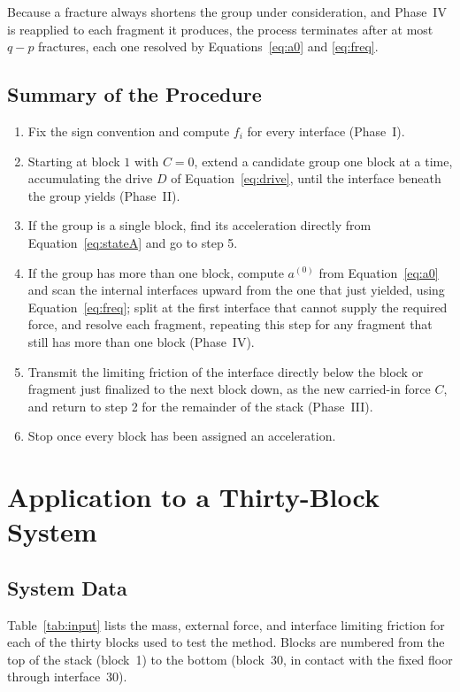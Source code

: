 \documentclass[11pt,a4paper]{article}
\begin{document}
Because a fracture always shortens the group under consideration, and Phase~IV is reapplied to each fragment it produces, the process terminates after at most $q-p$ fractures, each one resolved by Equations~\eqref{eq:a0} and \eqref{eq:freq}.

\subsection{Summary of the Procedure}

\begin{enumerate}[leftmargin=1.6em]
\item Fix the sign convention and compute $f_i$ for every interface (Phase~I).
\item Starting at block $1$ with $C=0$, extend a candidate group one block at a time, accumulating the drive $D$ of Equation~\eqref{eq:drive}, until the interface beneath the group yields (Phase~II).
\item If the group is a single block, find its acceleration directly from Equation~\eqref{eq:stateA} and go to step 5.
\item If the group has more than one block, compute $a^{(0)}$ from Equation~\eqref{eq:a0} and scan the internal interfaces upward from the one that just yielded, using Equation~\eqref{eq:freq}; split at the first interface that cannot supply the required force, and resolve each fragment, repeating this step for any fragment that still has more than one block (Phase~IV).
\item Transmit the limiting friction of the interface directly below the block or fragment just finalized to the next block down, as the new carried-in force $C$, and return to step 2 for the remainder of the stack (Phase~III).
\item Stop once every block has been assigned an acceleration.
\end{enumerate}

\section{Application to a Thirty-Block System}
\label{sec:application}

\subsection{System Data}

Table~\ref{tab:input} lists the mass, external force, and interface limiting friction for each of the thirty blocks used to test the method. Blocks are numbered from the top of the stack (block~1) to the bottom (block~30, in contact with the fixed floor through interface~30).
\end{document}
